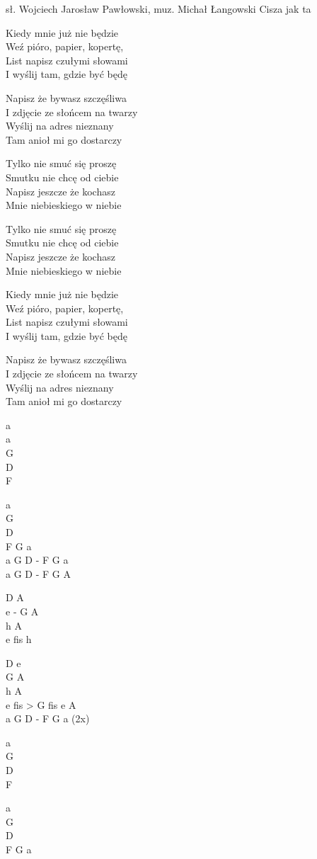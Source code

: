 {sł. Wojciech Jarosław Pawłowski, muz. Michał Łangowski}
{Cisza jak ta}
\begin{text}
    \hfill\break
Kiedy mnie już nie będzie\\
Weź pióro, papier, kopertę,\\
List napisz czułymi słowami\\
I wyślij tam, gdzie być będę

Napisz że bywasz szczęśliwa\\
I zdjęcie ze słońcem na twarzy\\
Wyślij na adres nieznany\\
Tam anioł mi go dostarczy

    \hfill\break
    \hfill\break
\vin Tylko nie smuć się proszę\\
\vin Smutku nie chcę od ciebie\\
\vin Napisz jeszcze że kochasz\\
\vin Mnie niebieskiego w niebie

\vin Tylko nie smuć się proszę\\
\vin Smutku nie chcę od ciebie\\
\vin Napisz jeszcze że kochasz\\
\vin Mnie niebieskiego w niebie

    \hfill\break
Kiedy mnie już nie będzie\\
Weź pióro, papier, kopertę,\\
List napisz czułymi słowami\\
I wyślij tam, gdzie być będę

Napisz że bywasz szczęśliwa\\
I zdjęcie ze słońcem na twarzy\\
Wyślij na adres nieznany\\
Tam anioł mi go dostarczy
\end{text}
\begin{chord}
a\\
a\\
G\\
D\\
F

a\\
G\\
D\\
F G a\\
a G D - F G a\\
a G D - F G A

D A\\
e - G A\\
h A\\
e fis h

D e\\
G A\\
h A\\
e fis > G fis e A\\
a G D - F G a (2x)

a\\
G\\
D\\
F

a\\
G\\
D\\
F G a
\end{chord}
